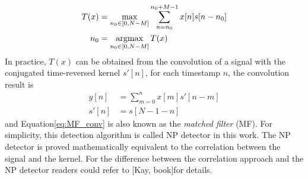 \begin{align}\label{eq:MF_Tx_argmax}
    T(x)&=\max_{n_0\in[0,N-M]}\sum_{n=n_0}^{n_0+M-1}x[n]s[n-n_0]\\
    n_0&= \operatorname*{argmax}_{n_0\in[0, N-M]}T(x)
\end{align}
In practice,  $T(x)$ can be obtained from the convolution of a signal with the conjugated time-reversed kernel $s'[n]$, \ie for each timestamp $n$, the convolution result is
\begin{align}\label{eq:MF_conv}
y[n]&=\sum_{m=0}^nx[m]s'[n-m]\\
s'[n]&=s[N-1-n]
\end{align}
and Equation\eqref{eq:MF_conv} is also known as the \emph{matched filter} (MF). For simplicity, this detection algorithm is called NP detector in this work. The NP detector is proved mathematically equivalent to the correlation between the signal and the kernel. For the difference between the correlation approach and the NP detector readers could refer to [Kay, book]for details.
